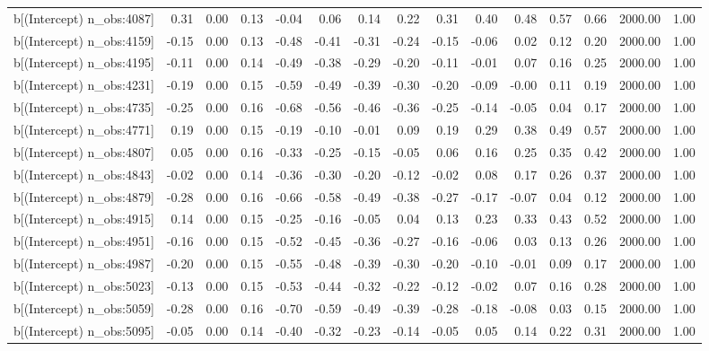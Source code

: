 \begin{table}[ht]
\begin{tabular}{rrrrrrrrrrrrrrr}
  b[(Intercept) n\_obs:4087] & 0.31 & 0.00 & 0.13 & -0.04 & 0.06 & 0.14 & 0.22 & 0.31 & 0.40 & 0.48 & 0.57 & 0.66 & 2000.00 & 1.00 \\ 
  b[(Intercept) n\_obs:4159] & -0.15 & 0.00 & 0.13 & -0.48 & -0.41 & -0.31 & -0.24 & -0.15 & -0.06 & 0.02 & 0.12 & 0.20 & 2000.00 & 1.00 \\ 
  b[(Intercept) n\_obs:4195] & -0.11 & 0.00 & 0.14 & -0.49 & -0.38 & -0.29 & -0.20 & -0.11 & -0.01 & 0.07 & 0.16 & 0.25 & 2000.00 & 1.00 \\ 
  b[(Intercept) n\_obs:4231] & -0.19 & 0.00 & 0.15 & -0.59 & -0.49 & -0.39 & -0.30 & -0.20 & -0.09 & -0.00 & 0.11 & 0.19 & 2000.00 & 1.00 \\ 
  b[(Intercept) n\_obs:4735] & -0.25 & 0.00 & 0.16 & -0.68 & -0.56 & -0.46 & -0.36 & -0.25 & -0.14 & -0.05 & 0.04 & 0.17 & 2000.00 & 1.00 \\ 
  b[(Intercept) n\_obs:4771] & 0.19 & 0.00 & 0.15 & -0.19 & -0.10 & -0.01 & 0.09 & 0.19 & 0.29 & 0.38 & 0.49 & 0.57 & 2000.00 & 1.00 \\ 
  b[(Intercept) n\_obs:4807] & 0.05 & 0.00 & 0.16 & -0.33 & -0.25 & -0.15 & -0.05 & 0.06 & 0.16 & 0.25 & 0.35 & 0.42 & 2000.00 & 1.00 \\ 
  b[(Intercept) n\_obs:4843] & -0.02 & 0.00 & 0.14 & -0.36 & -0.30 & -0.20 & -0.12 & -0.02 & 0.08 & 0.17 & 0.26 & 0.37 & 2000.00 & 1.00 \\ 
  b[(Intercept) n\_obs:4879] & -0.28 & 0.00 & 0.16 & -0.66 & -0.58 & -0.49 & -0.38 & -0.27 & -0.17 & -0.07 & 0.04 & 0.12 & 2000.00 & 1.00 \\ 
  b[(Intercept) n\_obs:4915] & 0.14 & 0.00 & 0.15 & -0.25 & -0.16 & -0.05 & 0.04 & 0.13 & 0.23 & 0.33 & 0.43 & 0.52 & 2000.00 & 1.00 \\ 
  b[(Intercept) n\_obs:4951] & -0.16 & 0.00 & 0.15 & -0.52 & -0.45 & -0.36 & -0.27 & -0.16 & -0.06 & 0.03 & 0.13 & 0.26 & 2000.00 & 1.00 \\ 
  b[(Intercept) n\_obs:4987] & -0.20 & 0.00 & 0.15 & -0.55 & -0.48 & -0.39 & -0.30 & -0.20 & -0.10 & -0.01 & 0.09 & 0.17 & 2000.00 & 1.00 \\ 
  b[(Intercept) n\_obs:5023] & -0.13 & 0.00 & 0.15 & -0.53 & -0.44 & -0.32 & -0.22 & -0.12 & -0.02 & 0.07 & 0.16 & 0.28 & 2000.00 & 1.00 \\ 
  b[(Intercept) n\_obs:5059] & -0.28 & 0.00 & 0.16 & -0.70 & -0.59 & -0.49 & -0.39 & -0.28 & -0.18 & -0.08 & 0.03 & 0.15 & 2000.00 & 1.00 \\ 
  b[(Intercept) n\_obs:5095] & -0.05 & 0.00 & 0.14 & -0.40 & -0.32 & -0.23 & -0.14 & -0.05 & 0.05 & 0.14 & 0.22 & 0.31 & 2000.00 & 1.00 \\ 

\end{tabular}
\end{table}
